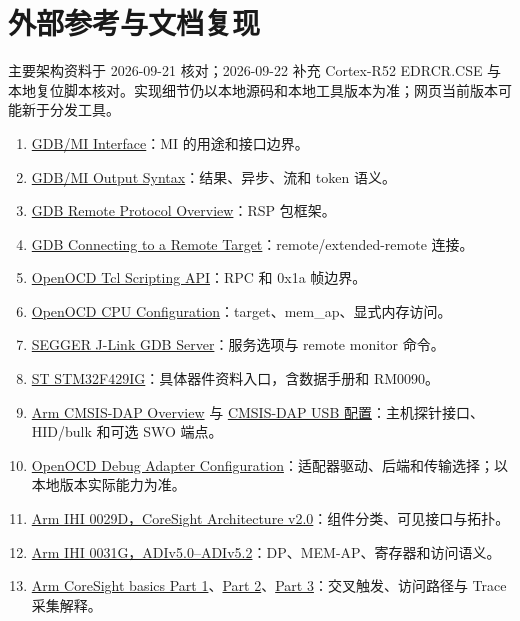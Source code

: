 \documentclass[UTF8,a4paper,11pt,oneside,fontset=none]{ctexart}
\newcommand{\newsection}[1]{\par\Needspace{10\baselineskip}\section{#1}}
\begin{document}
\newsection{外部参考与文档复现}
主要架构资料于 2026-09-21 核对；2026-09-22 补充 Cortex-R52 EDRCR.CSE 与本地复位脚本核对。实现细节仍以本地源码和本地工具版本为准；网页当前版本可能新于分发工具。
\begin{enumerate}
\item \href{https://sourceware.org/gdb/current/onlinedocs/gdb.html/GDB_002fMI.html}{GDB/MI Interface}：MI 的用途和接口边界。
\item \href{https://sourceware.org/gdb/current/onlinedocs/gdb.html/GDB_002fMI-Output-Syntax.html}{GDB/MI Output Syntax}：结果、异步、流和 token 语义。
\item \href{https://sourceware.org/gdb/current/onlinedocs/gdb.html/Overview.html}{GDB Remote Protocol Overview}：RSP 包框架。
\item \href{https://sourceware.org/gdb/current/onlinedocs/gdb.html/Connecting.html}{GDB Connecting to a Remote Target}：remote/extended-remote 连接。
\item \href{https://openocd.org/doc/html/Tcl-Scripting-API.html}{OpenOCD Tcl Scripting API}：RPC 和 0x1a 帧边界。
\item \href{https://openocd.org/doc/html/CPU-Configuration.html}{OpenOCD CPU Configuration}：target、mem\_ap、显式内存访问。
\item \href{https://kb.segger.com/J-Link_GDB_Server}{SEGGER J-Link GDB Server}：服务选项与 remote monitor 命令。
\item \href{https://www.st.com/en/microcontrollers-microprocessors/stm32f429ig.html}{ST STM32F429IG}：具体器件资料入口，含数据手册和 RM0090。
\item \href{https://arm-software.github.io/CMSIS-DAP/latest/}{Arm CMSIS-DAP Overview} 与 \href{https://arm-software.github.io/CMSIS_5/5.7.0/DAP/html/group__DAP__ConfigUSB__gr.html}{CMSIS-DAP USB 配置}：主机探针接口、HID/bulk 和可选 SWO 端点。
\item \href{https://openocd.org/doc/html/Debug-Adapter-Configuration.html}{OpenOCD Debug Adapter Configuration}：适配器驱动、后端和传输选择；以本地版本实际能力为准。
\item \href{https://documentation-service.arm.com/static/5f9009d5f86e16515cdc0417}{Arm IHI 0029D，CoreSight Architecture v2.0}：组件分类、可见接口与拓扑。
\item \href{https://documentation-service.arm.com/static/622222b2e6f58973271ebc21}{Arm IHI 0031G，ADIv5.0--ADIv5.2}：DP、MEM-AP、寄存器和访问语义。
\item \href{https://developer.arm.com/community/arm-community-blogs/b/architectures-and-processors-blog/posts/how-to-debug-coresight-basics-part-1}{Arm CoreSight basics Part 1}、\href{https://developer.arm.com/community/arm-community-blogs/b/architectures-and-processors-blog/posts/how-to-debug-coresight-basics-part-2}{Part 2}、\href{https://developer.arm.com/community/arm-community-blogs/b/architectures-and-processors-blog/posts/how-to-debug-coresight-basics-part-3}{Part 3}：交叉触发、访问路径与 Trace 采集解释。

\end{enumerate}
\end{document}
